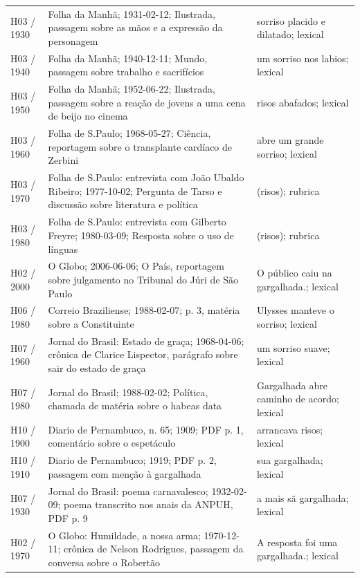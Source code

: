 \begin{longtable}{>{\raggedright\arraybackslash}p{}>{\raggedright\arraybackslash}p{}>{\raggedright\arraybackslash}p{}}
H03 / 1930 & Folha da Manhã; 1931-02-12; Ilustrada, passagem sobre as mãos e a expressão da personagem & sorriso placido e dilatado; lexical \cite{acervoD076} \\
H03 / 1940 & Folha da Manhã; 1940-12-11; Mundo, passagem sobre trabalho e sacrifícios & um sorriso nos labios; lexical \cite{acervoD077} \\
H03 / 1950 & Folha da Manhã; 1952-06-22; Ilustrada, passagem sobre a reação de jovens a uma cena de beijo no cinema & risos abafados; lexical \cite{acervoD078} \\
H03 / 1960 & Folha de S.Paulo; 1968-05-27; Ciência, reportagem sobre o transplante cardíaco de Zerbini & abre um grande sorriso; lexical \cite{acervoD079} \\
H03 / 1970 & Folha de S.Paulo: entrevista com João Ubaldo Ribeiro; 1977-10-02; Pergunta de Tarso e discussão sobre literatura e política & (risos); rubrica \cite{acervoD080} \\
H03 / 1980 & Folha de S.Paulo: entrevista com Gilberto Freyre; 1980-03-09; Resposta sobre o uso de línguas & (risos); rubrica \cite{acervoD081} \\
H02 / 2000 & O Globo; 2006-06-06; O País, reportagem sobre julgamento no Tribunal do Júri de São Paulo & O público caiu na gargalhada.; lexical \cite{acervoD082} \\
H06 / 1980 & Correio Braziliense; 1988-02-07; p. 3, matéria sobre a Constituinte & Ulysses manteve o sorriso; lexical \cite{acervoD083} \\
H07 / 1960 & Jornal do Brasil: Estado de graça; 1968-04-06; crônica de Clarice Lispector, parágrafo sobre sair do estado de graça & um sorriso suave; lexical \cite{acervoD084} \\
H07 / 1980 & Jornal do Brasil; 1988-02-02; Política, chamada de matéria sobre o habeas data & Gargalhada abre caminho de acordo; lexical \cite{acervoD085} \\
H10 / 1900 & Diario de Pernambuco, n. 65; 1909; PDF p. 1, comentário sobre o espetáculo & arrancava risos; lexical \cite{acervoD086} \\
H10 / 1910 & Diario de Pernambuco; 1919; PDF p. 2, passagem com menção à gargalhada & sua gargalhada; lexical \cite{acervoD087} \\
H07 / 1930 & Jornal do Brasil: poema carnavalesco; 1932-02-09; poema transcrito nos anais da ANPUH, PDF p. 9 & a mais sã gargalhada; lexical \cite{acervoD088} \\
H02 / 1970 & O Globo: Humildade, a nossa arma; 1970-12-11; crônica de Nelson Rodrigues, passagem da conversa sobre o Robertão & A resposta foi uma gargalhada.; lexical \cite{acervoD089} \\

\end{longtable}
